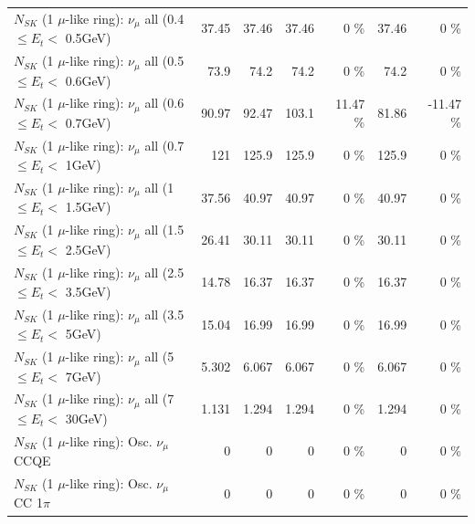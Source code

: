 \begin{table}
\begin{tabular}{| l | r | r | r  r | r  r |}
       $N_{SK}$ (1 $\mu$-like ring): $\nu_{\mu}$ all (0.4 $\leq E_{t} <$ 0.5GeV) &           37.45 &           37.46 &           37.46 &        0 \%  &           37.46 &        0 \%  \\ 
       $N_{SK}$ (1 $\mu$-like ring): $\nu_{\mu}$ all (0.5 $\leq E_{t} <$ 0.6GeV) &            73.9 &            74.2 &            74.2 &        0 \%  &            74.2 &        0 \%  \\ 
       $N_{SK}$ (1 $\mu$-like ring): $\nu_{\mu}$ all (0.6 $\leq E_{t} <$ 0.7GeV) &           90.97 &           92.47 &           103.1 &    11.47 \%  &           81.86 &   -11.47 \%  \\ 
         $N_{SK}$ (1 $\mu$-like ring): $\nu_{\mu}$ all (0.7 $\leq E_{t} <$ 1GeV) &             121 &           125.9 &           125.9 &        0 \%  &           125.9 &        0 \%  \\ 
         $N_{SK}$ (1 $\mu$-like ring): $\nu_{\mu}$ all (1 $\leq E_{t} <$ 1.5GeV) &           37.56 &           40.97 &           40.97 &        0 \%  &           40.97 &        0 \%  \\ 
       $N_{SK}$ (1 $\mu$-like ring): $\nu_{\mu}$ all (1.5 $\leq E_{t} <$ 2.5GeV) &           26.41 &           30.11 &           30.11 &        0 \%  &           30.11 &        0 \%  \\ 
       $N_{SK}$ (1 $\mu$-like ring): $\nu_{\mu}$ all (2.5 $\leq E_{t} <$ 3.5GeV) &           14.78 &           16.37 &           16.37 &        0 \%  &           16.37 &        0 \%  \\ 
         $N_{SK}$ (1 $\mu$-like ring): $\nu_{\mu}$ all (3.5 $\leq E_{t} <$ 5GeV) &           15.04 &           16.99 &           16.99 &        0 \%  &           16.99 &        0 \%  \\ 
           $N_{SK}$ (1 $\mu$-like ring): $\nu_{\mu}$ all (5 $\leq E_{t} <$ 7GeV) &           5.302 &           6.067 &           6.067 &        0 \%  &           6.067 &        0 \%  \\ 
          $N_{SK}$ (1 $\mu$-like ring): $\nu_{\mu}$ all (7 $\leq E_{t} <$ 30GeV) &           1.131 &           1.294 &           1.294 &        0 \%  &           1.294 &        0 \%  \\ 
\hline
\hline
                               $N_{SK}$ (1 $\mu$-like ring): Osc. $\nu_\mu$ CCQE &               0 &               0 &               0 &        0 \%  &               0 &        0 \%  \\ 
                          $N_{SK}$ (1 $\mu$-like ring): Osc. $\nu_\mu$ CC 1$\pi$ &               0 &               0 &               0 &        0 \%  &               0 &        0 \%  \\ 

\end{tabular}
\end{table}
